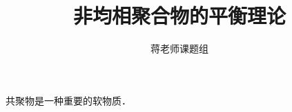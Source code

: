 \documentclass[12pt,a4paper]{article}
\title{非均相聚合物的平衡理论}
\author{蒋老师课题组}
\date{\chntoday}
\begin{document}
\maketitle

共聚物是一种重要的软物质．\\


\cite{tam19912d}

\end{document}
